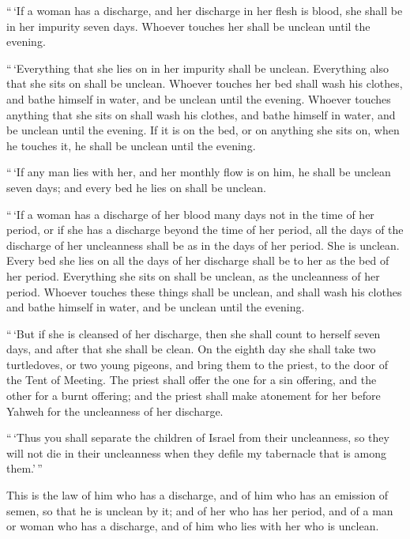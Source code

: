  ``\,`If a woman has a discharge, and her discharge in her
flesh is blood, she shall be in her impurity seven days. Whoever touches
her shall be unclean until the evening.

 ``\,`Everything that she lies on in her impurity shall be
unclean. Everything also that she sits on shall be unclean.
 Whoever touches her bed shall wash his clothes, and bathe
himself in water, and be unclean until the evening. 
Whoever touches anything that she sits on shall wash his clothes, and
bathe himself in water, and be unclean until the evening. 
If it is on the bed, or on anything she sits on, when he touches it, he
shall be unclean until the evening.

 ``\,`If any man lies with her, and her monthly flow is on
him, he shall be unclean seven days; and every bed he lies on shall be
unclean.

 ``\,`If a woman has a discharge of her blood many days not
in the time of her period, or if she has a discharge beyond the time of
her period, all the days of the discharge of her uncleanness shall be as
in the days of her period. She is unclean.  Every bed she
lies on all the days of her discharge shall be to her as the bed of her
period. Everything she sits on shall be unclean, as the uncleanness of
her period.  Whoever touches these things shall be unclean,
and shall wash his clothes and bathe himself in water, and be unclean
until the evening.

 ``\,`But if she is cleansed of her discharge, then she
shall count to herself seven days, and after that she shall be clean.
 On the eighth day she shall take two turtledoves, or two
young pigeons, and bring them to the priest, to the door of the Tent of
Meeting.  The priest shall offer the one for a sin
offering, and the other for a burnt offering; and the priest shall make
atonement for her before Yahweh for the uncleanness of her discharge.

 ``\,`Thus you shall separate the children of Israel from
their uncleanness, so they will not die in their uncleanness when they
defile my tabernacle that is among them.'\,''

 This is the law of him who has a discharge, and of him who
has an emission of semen, so that he is unclean by it;  and
of her who has her period, and of a man or woman who has a discharge,
and of him who lies with her who is unclean.

